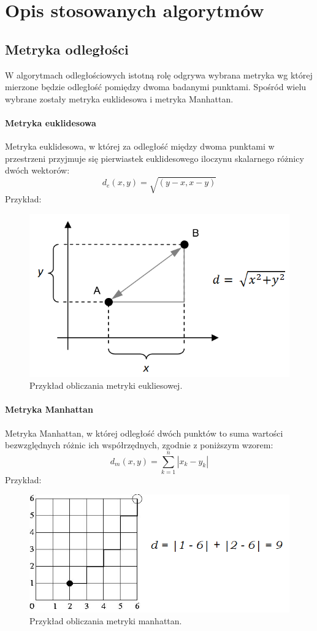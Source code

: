 \documentclass[11pt, a4paper, titlepage]{report}
\begin{document}
\chapter{Opis stosowanych algorytmów}
\label{chap:Opis stosowanych algorytmów}
\section{Metryka odległości}
\label{sec:Metryka odległosci}
W algorytmach odległościowych istotną rolę odgrywa wybrana metryka wg której mierzone będzie odległość pomiędzy dwoma badanymi punktami. Spośród wielu wybrane zostały metryka euklidesowa i metryka Manhattan.
\subsubsection{Metryka euklidesowa}
\label{subs:Metryka euklidesowa}
Metryka euklidesowa, w której za odległość między dwoma punktami w przestrzeni przyjmuje się pierwiastek euklidesowego iloczynu skalarnego różnicy dwóch wektorów:
$$d_e(x,y) = \sqrt{(y-x, x-y)}$$
Przykład:
\begin{figure}[h]
  \centering
  \includegraphics[scale=0.5]{obrazki/euklides}
  \caption{Przykład obliczania metryki eukliesowej.}
\end{figure}
\subsubsection{Metryka Manhattan}
\label{subs:Metryka Manhattan}
Metryka Manhattan, w której odległość dwóch punktów to suma wartości bezwzględnych różnic ich współrzędnych, zgodnie z poniższym wzorem:
$$d_m(x,y) = \sum\limits_{k=1}^n |x_k - y_k|$$
Przykład:
\begin{figure}[h]
  \centering
  \includegraphics[scale=0.5]{obrazki/manhattan}
  \caption{Przykład obliczania metryki manhattan.}
\end{figure}
\end{document}
